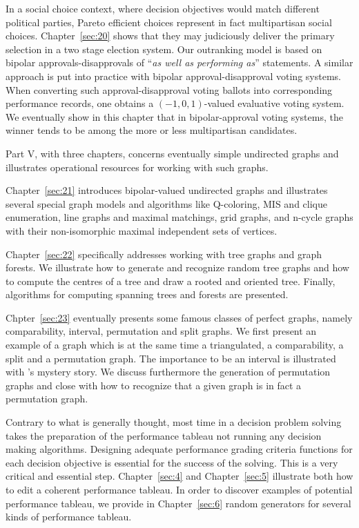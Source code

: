 In a social choice context, where decision objectives would match different political parties, Pareto efficient choices represent in fact multipartisan social choices. Chapter~\vref{sec:20} shows that they may judiciously deliver the primary selection in a two stage election system. Our outranking model is based on bipolar approvals-disapprovals of ``\emph{as well as performing as}'' statements. A similar approach is put into practice with bipolar approval-disapproval voting systems. When converting such approval-disapproval voting ballots into corresponding performance records, one obtains a $(-1,0,1)$-valued evaluative voting system. We eventually show in this chapter that in bipolar-approval voting systems, the winner tends to be among the more or less multipartisan candidates.

Part V, with three chapters, concerns eventually simple undirected graphs and illustrates operational resources for working with such graphs.

Chapter~\vref{sec:21} introduces bipolar-valued undirected graphs and illustrates several special graph models and algorithms like Q-coloring, MIS and clique enumeration, line graphs and maximal matchings, grid graphs, and n-cycle graphs with their non-isomorphic maximal independent sets of vertices.

Chapter~\vref{sec:22} specifically addresses working with tree graphs and graph forests. We illustrate how to generate and recognize random tree graphs and how to compute the centres of a tree and draw a rooted and oriented tree. Finally, algorithms for computing spanning trees and forests are presented.

Chpter~\vref{sec:23} eventually presents some famous classes of perfect graphs, namely comparability, interval, permutation and split graphs. We first present an example of a graph which is at the same time a triangulated, a comparability, a split and a permutation graph. The importance to be an interval is illustrated with \Berge ’s mystery story. We discuss furthermore the generation of permutation graphs and close with how to recognize that a given graph is in fact a permutation graph.

{}
\label{asec:0.1}

Contrary to what is generally thought, most time in a decision problem solving takes the preparation of the performance tableau not running any decision making algorithms. Designing adequate performance grading criteria functions for each decision objective is essential for the success of the solving. This is a very critical and essential step. Chapter~\ref{sec:4} and Chapter~\ref{sec:5} illustrate both how to edit a coherent performance tableau. In order to discover examples of potential performance tableau, we provide in Chapter~\ref{sec:6} random generators for several kinds of performance tableau. 

